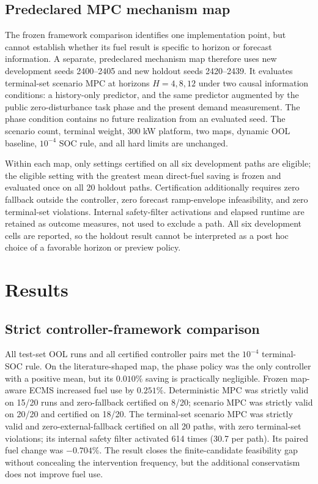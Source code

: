 \documentclass[agriengineering,article,submit,moreauthors]{Definitions/mdpi}
\begin{document}
\subsection{Predeclared MPC mechanism map}
The frozen framework comparison identifies one implementation point, but cannot establish whether its fuel result is specific to horizon or forecast information. A separate, predeclared mechanism map therefore uses new development seeds 2400--2405 and new holdout seeds 2420--2439. It evaluates terminal-set scenario MPC at horizons $H=4,8,12$ under two causal information conditions: a history-only predictor, and the same predictor augmented by the public zero-disturbance task phase and the present demand measurement. The phase condition contains no future realization from an evaluated seed. The scenario count, terminal weight, 300 kW platform, two maps, dynamic OOL baseline, $10^{-4}$ SOC rule, and all hard limits are unchanged.

Within each map, only settings certified on all six development paths are eligible; the eligible setting with the greatest mean direct-fuel saving is frozen and evaluated once on all 20 holdout paths. Certification additionally requires zero fallback outside the controller, zero forecast ramp-envelope infeasibility, and zero terminal-set violations. Internal safety-filter activations and elapsed runtime are retained as outcome measures, not used to exclude a path. All six development cells are reported, so the holdout result cannot be interpreted as a post hoc choice of a favorable horizon or preview policy.

\section{Results}
\subsection{Strict controller-framework comparison}
All test-set OOL runs and all certified controller pairs met the $10^{-4}$ terminal-SOC rule. On the literature-shaped map, the phase policy was the only controller with a positive mean, but its $0.010\%$ saving is practically negligible. Frozen map-aware ECMS increased fuel use by $0.251\%$. Deterministic MPC was strictly valid on 15/20 runs and zero-fallback certified on 8/20; scenario MPC was strictly valid on 20/20 and certified on 18/20. The terminal-set scenario MPC was strictly valid and zero-external-fallback certified on all 20 paths, with zero terminal-set violations; its internal safety filter activated 614 times (30.7 per path). Its paired fuel change was $-0.704\%$. The result closes the finite-candidate feasibility gap without concealing the intervention frequency, but the additional conservatism does not improve fuel use.
\end{document}
